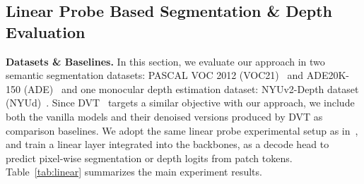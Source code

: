 \documentclass{article}
\begin{document}
\subsection{Linear Probe Based Segmentation \& Depth Evaluation}\label{section_linear}
\vspace{-.2cm}
\textbf{Datasets \& Baselines.} In this section, we evaluate our approach in two semantic segmentation datasets: PASCAL VOC 2012 (VOC21)~\cite{everingham2015pascal} and ADE20K-150 (ADE)~\cite{ade20k} and one monocular depth estimation dataset: NYUv2-Depth dataset (NYUd)~\cite{silberman2012nyu}.
Since DVT~\cite{yang2024denoising} targets a similar objective with our approach, we include both the vanilla models and their denoised versions produced by DVT as comparison baselines.
We adopt the same linear probe experimental setup as in~\citep{yang2024denoising}, and train a linear layer integrated into the backbones, as a decode head to predict pixel-wise segmentation or depth logits from patch tokens.
Table~\ref{tab:linear} summarizes the main experiment results.
\end{document}
